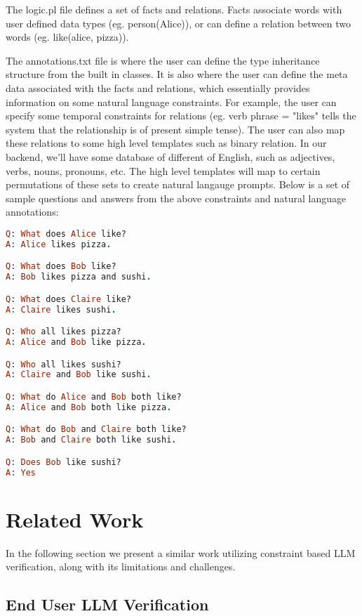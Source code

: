 \documentclass{article}
\begin{document}
The logic.pl file defines a set of facts and relations.  Facts associate words with user defined data types (eg. person(Alice)), or can define
a relation between two words (eg. like(alice, pizza)).


The annotations.txt file is where the user can define the type inheritance structure from the built in classes.  It is also where the user can define the meta data associated with the
facts and relations, which essentially provides information on some natural language constraints.  For example, the user can specify some temporal constraints for relations (eg. verb phrase = "likes" tells the system that the relationship is of present simple tense).
The user can also map these relations to some high level templates such as binary relation.  In our backend, we'll have some database of different of English, such as adjectives, verbs, nouns, pronouns, etc.  The high level templates will map to certain permutations of these sets to create natural langauge 
prompts.  Below is a set of sample questions and answers from the above constraints and natural language annotations:


\noindent
{}
\begin{lstlisting}[language=Prolog]
Q: What does Alice like?
A: Alice likes pizza.

Q: What does Bob like?
A: Bob likes pizza and sushi.

Q: What does Claire like?
A: Claire likes sushi.

Q: Who all likes pizza?
A: Alice and Bob like pizza.

Q: Who all likes sushi?
A: Claire and Bob like sushi.

Q: What do Alice and Bob both like?
A: Alice and Bob both like pizza.

Q: What do Bob and Claire both like?
A: Bob and Claire both like sushi.

Q: Does Bob like sushi?
A: Yes
\end{lstlisting}

\section{Related Work}
\label{gen_inst}

In the following section we present a similar work utilizing constraint based LLM verification, along with its limitations and challenges.

\subsection{End User LLM Verification}
\end{document}
